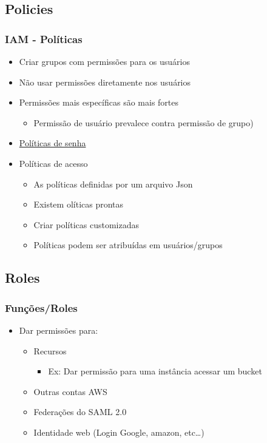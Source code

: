 \subsection{Policies}

\begin{frame}[allowframebreaks]
	\frametitle{IAM - Políticas}
	\begin{itemize}
		\item Criar grupos com permissões para os usuários
		\item Não usar permissões diretamente nos usuários
		\item Permissões mais específicas são mais fortes
			\begin{itemize}
				\item Permissão de usuário prevalece contra permissão de grupo)
			\end{itemize}
		\item \href{https://docs.aws.amazon.com/pt_br/IAM/latest/UserGuide/id_credentials_passwords_account-policy.html}{Políticas de senha}
		\framebreak
		\item Políticas de acesso
			\begin{itemize}
				\item As políticas definidas por um arquivo Json
				\item Existem olíticas prontas
				\item Criar políticas customizadas
				\item Políticas podem ser atribuídas em usuários/grupos
			\end{itemize}
	\end{itemize}
\end{frame}

\subsection{Roles}

\begin{frame}
	\frametitle{Funções/Roles}
	\begin{itemize}
		\item Dar permissões para:
			\begin{itemize}
				\item Recursos
				\begin{itemize}
					\item Ex: Dar permissão para uma instância acessar um bucket
				\end{itemize}
				\item Outras contas AWS
				\item Federações do SAML 2.0
				\item Identidade web (Login Google, amazon, etc\dots)
			\end{itemize}
	\end{itemize}
\end{frame}

